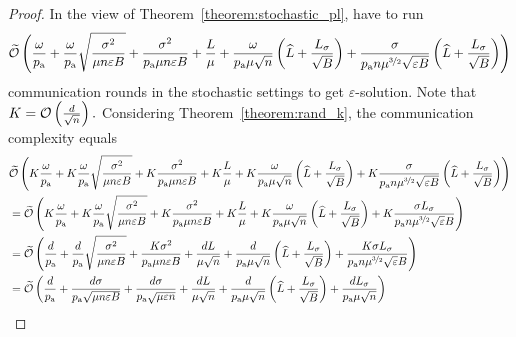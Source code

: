 \documentclass{article}
\newcommand{\algorithmname}{DASHA-PP}
\newcommand*{\probavailable}{\ensuremath{p_{\textnormal{a}}}}
\begin{document}
    \begin{proof}
      In the view of Theorem~\ref{theorem:stochastic_pl}, \algname{\algorithmname} have to run
      \begin{align*}
        \widetilde{\cO}\left(\frac{\omega}{\probavailable} + \frac{\omega}{\probavailable}\sqrt{\frac{\sigma^2}{\mu n \varepsilon B}} + \frac{\sigma^2}{\probavailable \mu n \varepsilon B} + \frac{L}{\mu} + \frac{\omega}{\probavailable \mu \sqrt{n}} \left(\widehat{L} + \frac{L_{\sigma}}{\sqrt{B}}\right) + \frac{\sigma}{\probavailable n \mu^{\nicefrac{3}{2}} \sqrt{\varepsilon B}}\left(\widehat{L} + \frac{L_{\sigma}}{\sqrt{B}}\right)\right)
      \end{align*}
    communication rounds in the stochastic settings to get $\varepsilon$-solution. Note that $K = \mathcal{O}\left(\frac{d}{\sqrt{n}}\right).$ Considering Theorem~\ref{theorem:rand_k}, the communication complexity equals 
    \begin{align*}
      &\widetilde{\cO}\left(K\frac{\omega}{\probavailable} + K\frac{\omega}{\probavailable}\sqrt{\frac{\sigma^2}{\mu n \varepsilon B}} + K\frac{\sigma^2}{\probavailable \mu n \varepsilon B} + K\frac{L}{\mu} + K\frac{\omega}{\probavailable \mu \sqrt{n}} \left(\widehat{L} + \frac{L_{\sigma}}{\sqrt{B}}\right) + K\frac{\sigma}{\probavailable n \mu^{\nicefrac{3}{2}} \sqrt{\varepsilon B}}\left(\widehat{L} + \frac{L_{\sigma}}{\sqrt{B}}\right)\right) \\
      &=\widetilde{\cO}\left(K\frac{\omega}{\probavailable} + K\frac{\omega}{\probavailable}\sqrt{\frac{\sigma^2}{\mu n \varepsilon B}} + K\frac{\sigma^2}{\probavailable \mu n \varepsilon B} + K\frac{L}{\mu} + K\frac{\omega}{\probavailable \mu \sqrt{n}} \left(\widehat{L} + \frac{L_{\sigma}}{\sqrt{B}}\right) + K\frac{\sigma L_{\sigma}}{\probavailable n \mu^{\nicefrac{3}{2}} \sqrt{\varepsilon} B}\right) \\
      &= \widetilde{\cO}\left(\frac{d}{\probavailable} + \frac{d}{\probavailable}\sqrt{\frac{\sigma^2}{\mu n \varepsilon B}} + \frac{K \sigma^2}{\probavailable \mu n \varepsilon B} + \frac{d L}{\mu \sqrt{n}} + \frac{d}{\probavailable \mu \sqrt{n}} \left(\widehat{L} + \frac{L_{\sigma}}{\sqrt{B}}\right) + \frac{K\sigma L_{\sigma}}{\probavailable n \mu^{\nicefrac{3}{2}} \sqrt{\varepsilon} B}\right) \\
      &= \widetilde{\cO}\left(\frac{d}{\probavailable} + \frac{d \sigma}{\probavailable \sqrt{\mu n \varepsilon B}} + \frac{d \sigma}{\probavailable \sqrt{\mu \varepsilon n}} + \frac{d L}{\mu \sqrt{n}} + \frac{d}{\probavailable \mu \sqrt{n}} \left(\widehat{L} + \frac{L_{\sigma}}{\sqrt{B}}\right) + \frac{d L_{\sigma}}{\probavailable \mu \sqrt{n}}\right) \\

\end{align*}
\end{proof}
\end{document}
